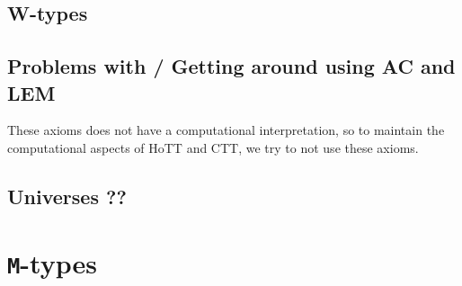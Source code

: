 \documentclass[twoside,11pt,openright]{report}
\theoremstyle{plain} %
\theoremstyle{definition}
\theoremstyle{remark}
\begin{document}
\section{W-types}

\section{Problems with / Getting around using AC and LEM}
These axioms does not have a computational interpretation, so to maintain the computational aspects of HoTT and CTT, we try to not use these axioms. \cite[Introduction]{hottbook}

\section{Universes ??}


\chapter{\texttt{M}-types}
\label{ch:m-types}
\end{document}
